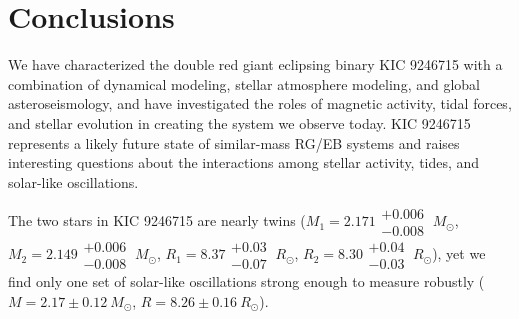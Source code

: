 \section{Conclusions}\label{conclude}

We have characterized the double red giant eclipsing binary KIC 9246715 with a combination of dynamical modeling, stellar atmosphere modeling, and global asteroseismology, and have investigated the roles of magnetic activity, tidal forces, and stellar evolution in creating the system we observe today. KIC 9246715 represents a likely future state of similar-mass RG/EB systems and raises interesting questions about the interactions among stellar activity, tides, and solar-like oscillations.

The two stars in KIC 9246715 are nearly twins ($M_1 = 2.171\substack{+0.006 \\ -0.008} \ M_{\odot}$, $M_2 = 2.149\substack{+0.006 \\ -0.008} \ M_{\odot}$, $R_1 = 8.37\substack{+0.03 \\ -0.07} \ R_{\odot}$, $R_2 = 8.30\substack{+0.04 \\ -0.03} \ R_{\odot}$), yet we find only one set of solar-like oscillations strong enough to measure robustly ($M = 2.17 \pm 0.12 \ M_{\odot}$, $R = 8.26 \pm 0.16 \ R_{\odot}$). 

